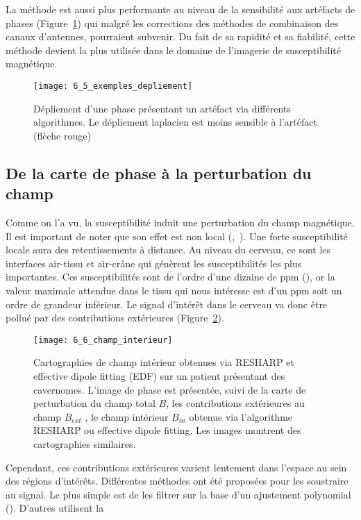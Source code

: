 {La méthode est aussi plus performante au niveau de la sensibilité aux artéfacts de phases
(Figure~\ref{fig:6_5_exemples_depliement}) qui malgré les corrections des méthodes de combinaison des canaux d’antennes,
pourraient subvenir. Du fait de sa rapidité et sa fiabilité, cette méthode devient la plus utilisée dans le
domaine de l’imagerie de susceptibilité magnétique.
\begin{figure}[!t]
\centering
\texttt{[image: 6\_5\_exemples\_depliement]}
\caption{Dépliement d'une phase présentant un artéfact via différents algorithmes. Le dépliement laplacien est
moins sensible à l’artéfact (flèche rouge)}
\label{fig:6_5_exemples_depliement}	
\end{figure}
\subsection{De la carte de phase à la perturbation du champ}
\label{sec:cartephasechamp}
Comme on l’a vu, la susceptibilité induit une perturbation du champ magnétique. Il est
important de noter que son effet est non local (\cite{Li2004},~\cite{Schweser2011}). Une forte susceptibilité locale aura des
retentissements à distance. Au niveau du cerveau, ce sont les interfaces air-tissu et air-crâne qui
génèrent les susceptibilités les plus importantes. Ces susceptibilités sont de l’ordre d’une dizaine de
ppm (\cite{Schenck1996}), or la valeur maximale attendue dans le tissu qui nous intéresse est d’un ppm soit un ordre
de grandeur inférieur. Le signal d’intérêt dans le cerveau va donc être pollué par des contributions
extérieures (Figure~\ref{fig:6_6_champ_interieur}). 
\begin{figure}[!t]
\centering
\texttt{[image: 6\_6\_champ\_interieur]}
\caption{Cartographies de champ intérieur obtenues via RESHARP et effective dipole fitting (EDF) sur un patient
présentant des cavernomes. L’image de phase est présentée, suivi de la carte de perturbation du champ total $B$, les
contributions extérieures au champ $B_{ext}$ , le champ intérieur $B_{in}$ obtenue via l’algorithme RESHARP ou effective dipole
fitting. Les images montrent des cartographies similaires.}
\label{fig:6_6_champ_interieur}	
\end{figure}
Cependant, ces contributions extérieures varient lentement dans l’espace au
sein des régions d’intérêts. Différentes méthodes ont été proposées pour les soustraire au signal. Le
plus simple est de les filtrer sur la base d’un ajustement polynomial (\cite{Duyn2007}). D’autres utilisent la
}

